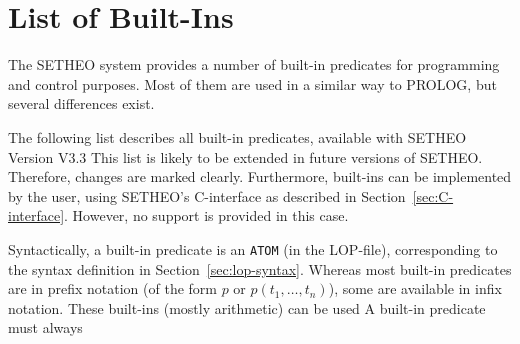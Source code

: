 \section{List of Built-Ins}

The SETHEO system provides a number of built-in predicates
for programming and control purposes.
Most of them are used in a similar way to PROLOG, but several
differences exist.

The following list describes all built-in predicates, available
with SETHEO Version V3.3
This list is likely to be extended in future versions of SETHEO.
Therefore, changes are marked clearly.
Furthermore, built-ins can be implemented by the user, using
SETHEO's C-interface as described in Section~\ref{sec:C-interface}.
However, no support is provided in this case.

Syntactically, a built-in predicate is an {\tt ATOM} 
(in the LOP-file), corresponding to the syntax definition in
Section~\ref{sec:lop-syntax}.
Whereas most built-in predicates are in prefix notation
(of the form $p$ or $p(t_1,\ldots,t_n)$), some are available
in infix notation. These built-ins (mostly arithmetic) can be
used 
A built-in predicate must always 
